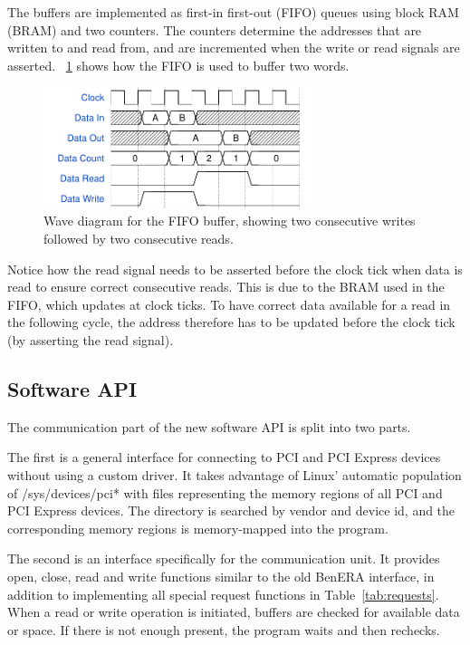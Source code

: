 The buffers are implemented as first-in first-out (FIFO) queues using block RAM (BRAM) and two counters.
The counters determine the addresses that are written to and read from, and are incremented when the write or read signals are asserted.
\figurename~\ref{fig:wavediagram-fifo} shows how the FIFO is used to buffer two words.

\begin{figure}[!ht]
    \centering
    \includegraphics[width=0.7\textwidth]{figures/wavediagram-fifo}
    \caption[FIFO buffer wave diagram]{
        Wave diagram for the FIFO buffer, showing two consecutive writes followed by two consecutive reads.
    }
    \label{fig:wavediagram-fifo}
\end{figure}

Notice how the read signal needs to be asserted before the clock tick when data is read to ensure correct consecutive reads.
This is due to the BRAM used in the FIFO, which updates at clock ticks.
To have correct data available for a read in the following cycle, the address therefore has to be updated before the clock tick (by asserting the read signal).

\subsection{Software API}

The communication part of the new software API is split into two parts.

The first is a general interface for connecting to PCI and PCI Express devices without using a custom driver.
It takes advantage of Linux' automatic population of /sys/devices/pci* with files representing the memory regions of all PCI and PCI Express devices.
The directory is searched by vendor and device id, and the corresponding memory regions is memory-mapped into the program.

The second is an interface specifically for the communication unit.
It provides open, close, read and write functions similar to the old BenERA interface, in addition to implementing all special request functions in Table~\ref{tab:requests}.
When a read or write operation is initiated, buffers are checked for available data or space.
If there is not enough present, the program waits and then rechecks.

